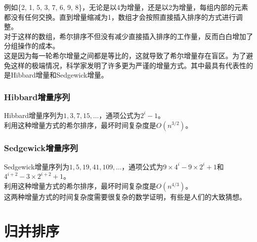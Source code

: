 例如\{2, 1, 5, 3, 7, 6, 9, 8\}，无论是以4为增量，还是以2为增量，每组内部的元素都没有任何交换。直到增量缩减为1，数组才会按照直接插入排序的方式进行调整。\\

对于这样的数组，希尔排序不但没有减少直接插入排序的工作量，反而白白增加了分组操作的成本。\\

这是因为每一轮希尔增量之间都是等比的，这就导致了希尔增量存在盲区。为了避免这样的极端情况，科学家发明了许多更为严谨的增量方式。其中最具有代表性的是Hibbard增量和Sedgewick增量。

\subsubsection{Hibbard增量序列}

Hibbard增量序列为$ 1, 3, 7, 15, \dots $，通项公式为$ 2^i - 1 $。\\

利用这种增量方式的希尔排序，最坏时间复杂度是$ O(n^{3/2}) $。\\

\subsubsection{Sedgewick增量序列}

Sedgewick增量序列为$ 1, 5, 19, 41, 109, \dots $，通项公式为$ 9 \times 4^i - 9 \times 2^i + 1 $和$ 4^{i+2} - 3 \times 2^{i+2} + 1 $。\\

利用这种增量方式的希尔排序，最坏时间复杂度是$ O(n^{4/3}) $。\\

这两种增量方式的时间复杂度需要很复杂的数学证明，有些是人们的大致猜想。

\begin{table}[H]
	\centering
	\caption{希尔排序算法分析}
\end{table}

\newpage

\section{归并排序}

